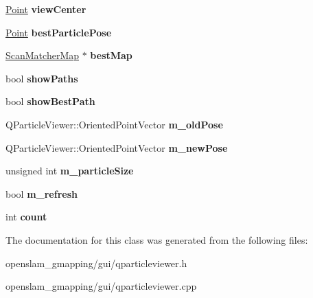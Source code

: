 \begin{DoxyCompactItemize}
\mbox{\label{classGMapping_1_1QParticleViewer_aef77f1bfc2f7fa7cbdc26a064458ad49}} 
\hyperlink{structGMapping_1_1point}{Point} {\bfseries view\+Center}
\item 
\mbox{\label{classGMapping_1_1QParticleViewer_a97fd8f6ec6cc2b2c11b65424f1a1679d}} 
\hyperlink{structGMapping_1_1point}{Point} {\bfseries best\+Particle\+Pose}
\item 
\mbox{\label{classGMapping_1_1QParticleViewer_aabd031c487806f42aa8c8bc68eb49b96}} 
\hyperlink{classGMapping_1_1Map}{Scan\+Matcher\+Map} $\ast$ {\bfseries best\+Map}
\item 
\mbox{\label{classGMapping_1_1QParticleViewer_addca8908dd8853bf26f42b0aee01f952}} 
bool {\bfseries show\+Paths}
\item 
\mbox{\label{classGMapping_1_1QParticleViewer_a3a399e6b82459d0039f877c85e17a8e0}} 
bool {\bfseries show\+Best\+Path}
\item 
\mbox{\label{classGMapping_1_1QParticleViewer_aa35c0a9530f88d9c932ee6977914d57b}} 
Q\+Particle\+Viewer\+::\+Oriented\+Point\+Vector {\bfseries m\+\_\+old\+Pose}
\item 
\mbox{\label{classGMapping_1_1QParticleViewer_a87331acc943d6ce2c443604a8f5fcfd8}} 
Q\+Particle\+Viewer\+::\+Oriented\+Point\+Vector {\bfseries m\+\_\+new\+Pose}
\item 
\mbox{\label{classGMapping_1_1QParticleViewer_ad3c06a02699c07a23c11a24958dd2a58}} 
unsigned int {\bfseries m\+\_\+particle\+Size}
\item 
\mbox{\label{classGMapping_1_1QParticleViewer_a3dbe87942f6fdf64caef1776d1ca201c}} 
bool {\bfseries m\+\_\+refresh}
\item 
\mbox{\label{classGMapping_1_1QParticleViewer_ab3d52756bda7bad4bd3ba7d33b8305b9}} 
int {\bfseries count}
\end{DoxyCompactItemize}


The documentation for this class was generated from the following files\+:\begin{DoxyCompactItemize}
\item 
openslam\+\_\+gmapping/gui/qparticleviewer.\+h\item 
openslam\+\_\+gmapping/gui/qparticleviewer.\+cpp\end{DoxyCompactItemize}
